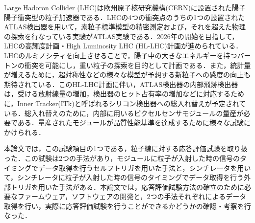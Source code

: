 Large Hadoron Collider (LHC)は欧州原子核研究機構(CERN)に設置された陽子陽子衝突型の粒子加速器である．LHCの4つの衝突点のうちの1つの設置されたATLAS検出器を用いて，素粒子標準模型の精密測定および，それを超えた物理の探索を行なっている実験がATLAS実験である．2026年の開始を目指して，LHCの高輝度計画・High Luminosity LHC (HL-LHC)計画が進められている．LHCのルミノシティを向上させることで，陽子中の大きなエネルギーを持つバートンの衝突を可能にし，重い粒子の探索を目的として計画である．また，統計量が増えるために，超対称性などの様々な模型が予想する新粒子への感度の向上も期待されている．このHL-LHC計画に伴い，ATLAS検出器の内部飛跡検出器は，受ける放射線量の増加，検出器のヒット占有率の増加などに対応するために，Inner Tracker(ITk)と呼ばれるシリコン検出器への総入れ替えが予定されている．総入れ替えのために，内部に用いるピクセルセンサモジュールの量産が必要である．量産されたモジュールが品質性能基準を達成するために様々な試験にかけられる．\par
本論文では，この試験項目の1つである，粒子線に対する応答評価試験を取り扱った．この試験は2つの手法があり，モジュールに粒子が入射した時の信号のタイミングでデータ取得を行うセルフトリガを用いた手法と，シンチレータを用いて，シンチレータに粒子が入射した時の信号のタイミングでデータ取得を行う外部トリガを用いた手法がある．本論文では，応答評価試験方法の確立のために必要なファームウェア，ソフトウェアの開発と，2つの手法それぞれによるデータ取得を行い，実際に応答評価試験を行うことができるかどうかの確認・考察を行なった．





